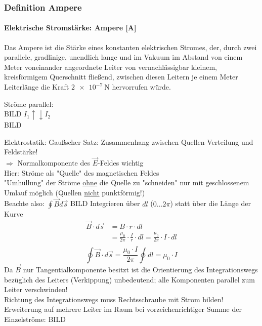 \subsubsection{Definition Ampere}
\paragraph{Elektrische Stromstärke: Ampere [A]}
Das Ampere ist die Stärke eines konstanten elektrischen Stromes, der, durch zwei parallele, gradlinige, unendlich lange und im Vakuum im Abstand von einem Meter voneinander angeordnete Leiter von vernachlässigbar kleinem, kreisförmigem Querschnitt fließend, zwischen diesen Leitern je einem Meter Leiterlänge die Kraft $ \SI{2e-7}{\newton} $ hervorrufen würde.\hfill \break

Ströme parallel:\\
BILD
$ I_1 \uparrow\downarrow I_2 $ \\
BILD

Elektrostatik: Gaußscher Satz: Zusammenhang zwischen Quellen-Verteilung und Feldstärke! \\
\indent $ \Rightarrow $ Normalkomponente des $ \vec{E} $-Feldes wichtig\\
Hier: Ströme als "Quelle" des magnetischen Feldes \\
"Umhüllung" der Ströme \underline{ohne} die Quelle zu "schneiden" nur mit geschlossenem Umlauf möglich (Quellen \underline{nicht} punktförmig!)\\
Beachte also: $ \displaystyle \oint\vec{B}d\vec{s} $
BILD
Integrieren über $ dl $ ($ 0...2\pi $) statt über die Länge der Kurve \\
\begin{align*}
\vec{B} \cdot d\vec{s} &= B \cdot r \cdot dl\\
&= \frac{\mu_0}{2\pi} \cdot \frac{I}{r} \cdot dl = \frac{\mu_0}{2\pi} \cdot I \cdot dl \\
\end{align*}
$$ \boxed{{\displaystyle \oint \vec{B}\cdot d\vec{s} = \frac{\mu_0 \cdot I}{2\pi} \oint dl = \mu_0 \cdot I}} $$
Da $ \vec{B} $ nur Tangentialkomponente besitzt ist die Orientierung des Integrationswegs bezüglich des Leiters (Verkippung) unbedeutend; alle Komponenten parallel zum Leiter verschwinden!\\
Richtung des Integrationswegs muss Rechtsschraube mit Strom bilden!\\
Erweiterung auf mehrere Leiter im Raum bei vorzeichenrichtiger Summe der Einzelströme:
BILD
